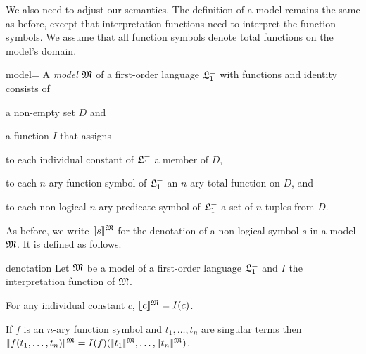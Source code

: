 
We also need to adjust our semantics.
The definition of a model remains the same as before,
except that interpretation functions need to interpret the function symbols.
We assume that all function symbols denote total functions on the model's domain.

\begin{definition}{}{model=}
  A \emph{model} $\mathfrak{M}$ of a first-order language $\mathfrak{L}_{1}^{=}$ with functions and identity consists of
  \begin{cenumerate}
    \item[(i)] a non-empty set $D$ and
    \item[(ii)] a function $I$ that assigns
    \begin{itemize*}
      \item to each individual constant of $\mathfrak{L}_{1}^{=}$ a member of $D$,
      \item to each $n$-ary function symbol of $\mathfrak{L}_{1}^{=}$ an $n$-ary total function on $D$, and
      \item to each non-logical $n$-ary predicate symbol of $\mathfrak{L}_{1}^=$ a set of $n$-tuples from $D$.
    \end{itemize*}
  \end{cenumerate}
\end{definition}

As before,
we write $\llbracket s \rrbracket^{\mathfrak{M}}$ for the denotation of a non-logical symbol $s$ in a model $\mathfrak{M}$.
It is defined as follows.

\begin{definition}{}{denotation}
    Let $\mathfrak{M}$ be a model of a first-order language $\mathfrak{L}_{1}^{=}$ and $I$ the interpretation function of $\mathfrak{M}$.
    \begin{cenumerate}
      \item[(i)] For any individual constant $c$, $\llbracket c \rrbracket^{\mathfrak{M}} = I(c)$.
      \item[(ii)] If $f$ is an $n$-ary function symbol and $t_1,\ldots,t_n$ are singular terms then
        $\llbracket f(t_1,\ldots,t_n) \rrbracket^{\mathfrak{M}} = I(f)(\llbracket t_1 \rrbracket^{\mathfrak{M}},\ldots,\llbracket t_n \rrbracket^{\mathfrak{M}})$.
    \end{cenumerate}
\end{definition}

